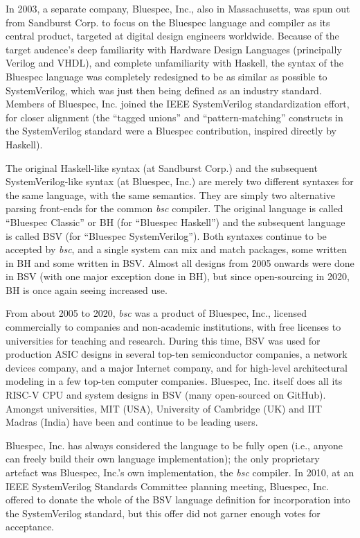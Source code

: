 \documentclass[twoside,letterpaper]{article}
\newcommand{\BH}{BH}
\newcommand{\BSV}{BSV}
\newcommand{\bsc}{\emph{bsc}}
\begin{document}
In 2003, a separate company, Bluespec, Inc., also in Massachusetts,
was spun out from Sandburst Corp. to focus on the Bluespec language
and compiler as its central product, targeted at digital design
engineers worldwide.  Because of the target audence's deep familiarity
with Hardware Design Languages (principally Verilog and VHDL), and
complete unfamiliarity with Haskell, the syntax of the Bluespec
language was completely redesigned to be as similar as possible to
SystemVerilog, which was just then being defined as an industry
standard.  Members of Bluespec, Inc. joined the IEEE SystemVerilog
standardization effort, for closer alignment (the ``tagged unions''
and ``pattern-matching'' constructs in the SystemVerilog standard were
a Bluespec contribution, inspired directly by Haskell).

The original Haskell-like syntax (at Sandburst Corp.) and the
subsequent SystemVerilog-like syntax (at Bluespec, Inc.) are merely
two different syntaxes for the same language, with the same semantics.
They are simply two alternative parsing front-ends for the common
{\bsc} compiler.  The original language is called ``Bluespec Classic''
or {\BH} (for ``Bluespec Haskell'') and the subsequent language is
called {\BSV} (for ``Bluespec SystemVerilog'').  Both syntaxes
continue to be accepted by {\bsc}, and a single system can mix and
match packages, some written in BH and some written in BSV.  Almost
all designs from 2005 onwards were done in BSV (with one major
exception done in BH), but since open-sourcing in 2020, BH is once
again seeing increased use.

From about 2005 to 2020, {\bsc} was a product of Bluespec, Inc.,
licensed commercially to companies and non-academic institutions, with
free licenses to universities for teaching and research.  During this
time, BSV was used for production ASIC designs in several top-ten
semiconductor companies, a network devices company, and a major
Internet company, and for high-level architectural modeling in a few
top-ten computer companies.  Bluespec, Inc. itself does all its RISC-V
CPU and system designs in BSV (many open-sourced on GitHub).  Amongst
universities, MIT (USA), University of Cambridge (UK) and IIT Madras
(India) have been and continue to be leading users.

Bluespec, Inc. has always considered the language to be fully open
(i.e., anyone can freely build their own language implementation); the
only proprietary artefact was Bluespec, Inc.'s own implementation, the
{\bsc} compiler.  In 2010, at an IEEE SystemVerilog Standards
Committee planning meeting, Bluespec, Inc. offered to donate the whole
of the BSV language definition for incorporation into the
SystemVerilog standard, but this offer did not garner enough votes for
acceptance.
\end{document}
